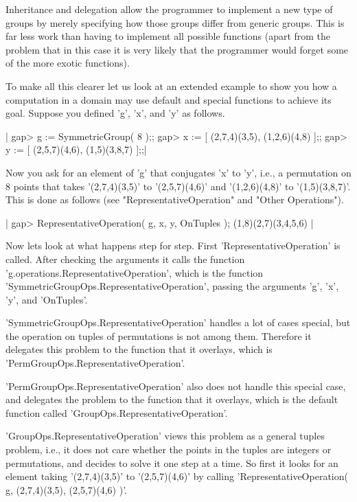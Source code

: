 Inheritance  and delegation allow the programmer to implement a new  type
of  groups  by merely  specifying  how  those groups differ  from generic
groups.   This is far less  work than  having  to implement  all possible
functions (apart  from  the problem  that in this case it is very  likely
that the programmer would forget some of the more exotic functions).

To make all  this clearer let  us look at an extended example to show you
how a computation  in a domain may use  default and special  functions to
achieve its goal.  Suppose you defined 'g', 'x', and 'y' as follows.

|    gap> g := SymmetricGroup( 8 );;
    gap> x := [ (2,7,4)(3,5), (1,2,6)(4,8) ];;
    gap> y := [ (2,5,7)(4,6), (1,5)(3,8,7) ];;|

Now you ask  for an  element  of 'g' that  conjugates 'x' to 'y', i.e., a
permutation on 8  points that  takes '(2,7,4)(3,5)' to '(2,5,7)(4,6)' and
'(1,2,6)(4,8)'  to  '(1,5)(3,8,7)'.    This  is   done  as  follows  (see
"RepresentativeOperation" and "Other Operations").

|    gap> RepresentativeOperation( g, x, y, OnTuples );
    (1,8)(2,7)(3,4,5,6) |

Now   lets    look    at   what    happens   step   for   step.     First
'RepresentativeOperation'  is  called.  After checking  the  arguments it
calls the function  'g.operations.RepresentativeOperation', which is  the
function    'SymmetricGroupOps.RepresentativeOperation',    passing   the
arguments 'g', 'x', 'y', and 'OnTuples'.

'SymmetricGroupOps.RepresentativeOperation'  handles  a  lot   of   cases
special, but  the operation on tuples of permutations is not among  them.
Therefore it  delegates this problem to the function  that  it  overlays,
which is 'PermGroupOps.RepresentativeOperation'.

'PermGroupOps.RepresentativeOperation' also does  not handle this special
case, and delegates the problem  to the function that it  overlays, which
is the default function called 'GroupOps.RepresentativeOperation'.

'GroupOps.RepresentativeOperation' views this problem as a general tuples
problem, i.e., it  does not  care  whether  the  points in the tuples are
integers or permutations, and decides to solve it one step at a time.  So
first it looks for  an element taking '(2,7,4)(3,5)' to '(2,5,7)(4,6)' by
calling 'RepresentativeOperation( g, (2,7,4)(3,5), (2,5,7)(4,6) )'.

